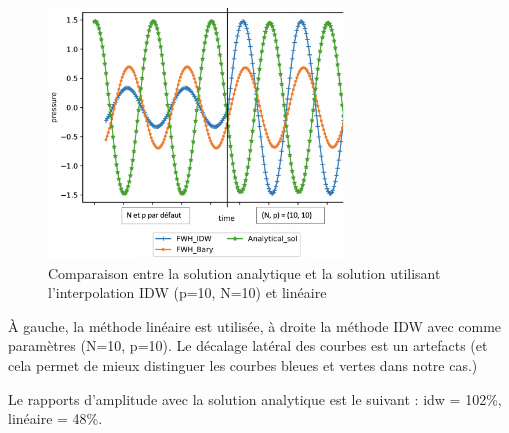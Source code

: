 \begin{figure}[H]
    \centering
    \includegraphics[width=0.70\textwidth]{images/rapport_a_np.png}
    \caption{Comparaison entre la solution analytique et la solution utilisant l'interpolation IDW (p=10, N=10) et linéaire}
\end{figure}

À gauche, la méthode linéaire est utilisée, à droite la méthode IDW avec comme paramètres (N=10, p=10). Le décalage latéral des courbes est un artefacts (et cela permet de mieux distinguer les courbes bleues et vertes dans notre cas.)

Le rapports d'amplitude avec la solution analytique est le suivant : idw = 102\%, linéaire = 48\%. %






